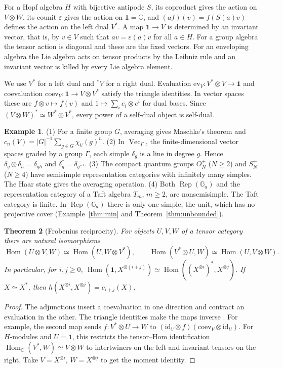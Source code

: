 \documentclass[11pt,reqno]{amsart}
\newtheorem{theorem}{Theorem}[section]
\theoremstyle{definition}
\newtheorem{example}[theorem]{Example}
\newcommand{\Hom}{\operatorname{Hom}}
\newcommand{\one}{\mathbf 1}
\newcommand{\CC}{\mathbb C}
\newcommand{\Ga}{\mathbb G_a}
\newcommand{\Rep}{\operatorname{Rep}}
\newcommand{\Vect}{\operatorname{Vec}}
\begin{document}
For a Hopf algebra $H$ with bijective antipode $S$, its coproduct gives the action on $V\otimes W$, its counit $\varepsilon$ gives the action on $\one=\CC$, and $(af)(v)=f(S(a)v)$ defines the action on the left dual $V^*$. A map $\one\to V$ is determined by an invariant vector, that is, by $v\in V$ such that $av=\varepsilon(a)v$ for all $a\in H$. For a group algebra the tensor action is diagonal and these are the fixed vectors. For an enveloping algebra the Lie algebra acts on tensor products by the Leibniz rule and an invariant vector is killed by every Lie algebra element.

We use $V^*$ for a left dual and ${}^*V$ for a right dual. Evaluation $\mathrm{ev}_V:V^*\otimes V\to\one$ and coevaluation $\mathrm{coev}_V:\one\to V\otimes V^*$ satisfy the triangle identities. In vector spaces these are $f\otimes v\mapsto f(v)$ and $1\mapsto\sum_i e_i\otimes e^i$ for dual bases. Since $(V\otimes W)^*\simeq W^*\otimes V^*$, every power of a self-dual object is self-dual.

\begin{example}\label{ex:tensorexamples}
(1) For a finite group $G$, averaging gives Maschke's theorem and $c_n(V)=|G|^{-1}\sum_{g\in G}\chi_V(g)^n$.
(2) In $\Vect_\Gamma$, the finite-dimensional vector spaces graded by a group $\Gamma$, each simple $\delta_g$ is a line in degree $g$. Hence $\delta_g\otimes\delta_h=\delta_{gh}$ and $\delta_g^*=\delta_{g^{-1}}$.
(3) The compact quantum groups $O_N^+$ ($N\ge2$) and $S_N^+$ ($N\ge4$) have semisimple representation categories with infinitely many simples. The Haar state gives the averaging operation.
(4) Both $\Rep(\Ga)$ and the representation category of a Taft algebra $T_m$, $m\ge2$, are nonsemisimple. The Taft category is finite. In $\Rep(\Ga)$ there is only one simple, the unit, which has no projective cover (Example~\ref{thm:min} and Theorem~\ref{thm:unbounded}).
\end{example}

\begin{theorem}[Frobenius reciprocity]\label{thm:frobenius}
For objects $U,V,W$ of a tensor category there are natural isomorphisms
\begin{equation}\label{eq:rigidity}
 \Hom(U\otimes V,W)\simeq\Hom(U,W\otimes V^*),\qquad
 \Hom(V^*\otimes U,W)\simeq\Hom(U,V\otimes W).
\end{equation}
In particular, for $i,j\ge0$, $\Hom(\one,X^{\otimes(i+j)})\simeq\Hom((X^{\otimes i})^*,X^{\otimes j})$. If $X\simeq X^*$, then $h(X^{\otimes i},X^{\otimes j})=c_{i+j}(X)$.
\end{theorem}
\begin{proof}
The adjunctions insert a coevaluation in one direction and contract an evaluation in the other. The triangle identities make the maps inverse \cite[Proposition~2.10.8(a)]{EGNO}. For example, the second map sends $f:V^*\otimes U\to W$ to $(\mathrm{id}_V\otimes f)(\mathrm{coev}_V\otimes\mathrm{id}_U)$. For $H$-modules and $U=\one$, this restricts the tensor--Hom identification $\Hom_{\CC}(V^*,W)\simeq V\otimes W$ to intertwiners on the left and invariant tensors on the right. Take $V=X^{\otimes i}$, $W=X^{\otimes j}$ to get the moment identity.
\end{proof}
\end{document}
